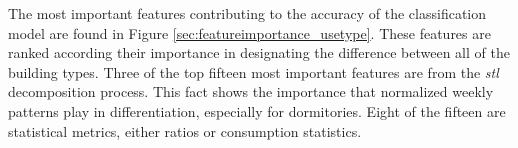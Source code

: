 The most important features contributing to the accuracy of the classification model are found in Figure \ref{sec:featureimportance_usetype}. These features are ranked according their importance in designating the difference between all of the building types. Three of the top fifteen most important features are from the \emph{stl} decomposition process. This fact shows the importance that normalized weekly patterns play in differentiation, especially for dormitories. Eight of the fifteen are statistical metrics, either ratios or consumption statistics.